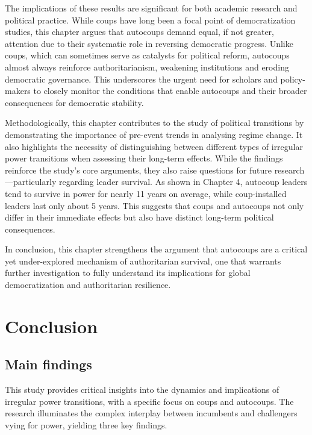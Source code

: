 \documentclass[
  12pt,
]{report}
\begin{document}
The implications of these results are significant for both academic
research and political practice. While coups have long been a focal
point of democratization studies, this chapter argues that autocoups
demand equal, if not greater, attention due to their systematic role in
reversing democratic progress. Unlike coups, which can sometimes serve
as catalysts for political reform, autocoups almost always reinforce
authoritarianism, weakening institutions and eroding democratic
governance. This underscores the urgent need for scholars and
policy-makers to closely monitor the conditions that enable autocoups
and their broader consequences for democratic stability.

Methodologically, this chapter contributes to the study of political
transitions by demonstrating the importance of pre-event trends in
analysing regime change. It also highlights the necessity of
distinguishing between different types of irregular power transitions
when assessing their long-term effects. While the findings reinforce the
study's core arguments, they also raise questions for future
research---particularly regarding leader survival. As shown in Chapter
4, autocoup leaders tend to survive in power for nearly 11 years on
average, while coup-installed leaders last only about 5 years. This
suggests that coups and autocoups not only differ in their immediate
effects but also have distinct long-term political consequences.

In conclusion, this chapter strengthens the argument that autocoups are
a critical yet under-explored mechanism of authoritarian survival, one
that warrants further investigation to fully understand its implications
for global democratization and authoritarian resilience.

\chapter{Conclusion}\label{conclusion}

\section{Main findings}\label{main-findings}

This study provides critical insights into the dynamics and implications
of irregular power transitions, with a specific focus on coups and
autocoups. The research illuminates the complex interplay between
incumbents and challengers vying for power, yielding three key findings.
\end{document}
